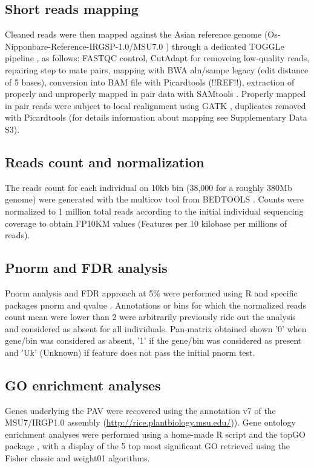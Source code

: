 \documentclass[10pt,letterpaper]{article}
\begin{document}
  \subsection*{Short reads mapping}
Cleaned reads were then mapped against the Asian reference genome (Os-Nipponbare-Reference-IRGSP-1.0/MSU7.0 \cite{Mcnally2009, Kawahara2013}) through a dedicated TOGGLe pipeline \cite{Monat2015, Tranchant2018}, as follows:
  FASTQC control, CutAdapt for removeing low-quality reads, repairing step to mate pairs, mapping with BWA aln/sampe legacy \cite{Li2009} (edit distance of 5 bases), conversion into BAM file with Picardtools (!!REF!!), extraction of properly and unproperly mapped in pair data with SAMtools \cite{Li2009a}. Properly mapped in pair reads were subject to  local realignment using GATK \cite{McKenna2010a}, duplicates removed with Picardtools (for details information about mapping see Supplementary Data S3).
  
  
  \subsection*{Reads count and normalization}
  The reads count for each individual on 10kb bin (38,000 for a roughly 380Mb genome) were generated with the multicov tool from BEDTOOLS \cite{Quinlan2014}. Counts were normalized to 1 million total reads according to the initial individual sequencing coverage to obtain FP10KM values (Features per 10 kilobase per millions of reads).
  
  
  \subsection*{Pnorm and FDR analysis}
  Pnorm analysis and FDR approach at 5\% were performed using R and specific packages pnorm and qvalue \cite{Storey2015}. Annotations or bins for which the normalized reads count mean were lower than 2 were arbitrarily previously ride out the analysis and considered as absent for all individuals. Pan-matrix obtained shown '0' when gene/bin was considered as absent,  '1' if the gene/bin was considered as present and  'Uk' (Unknown) if feature does not pass the initial pnorm test.
  
  \subsection*{GO enrichment analyses}
  Genes underlying the PAV were recovered using the annotation v7 of the MSU7/IRGP1.0 assembly (\url{http://rice.plantbiology.msu.edu/})). Gene ontology enrichment analyses were performed using a home-made R script and the topGO package \cite{Alexa2016}, with a display of the 5 top most significant GO retrieved using the Fisher classic and weight01 algorithms.
  
\end{document}
